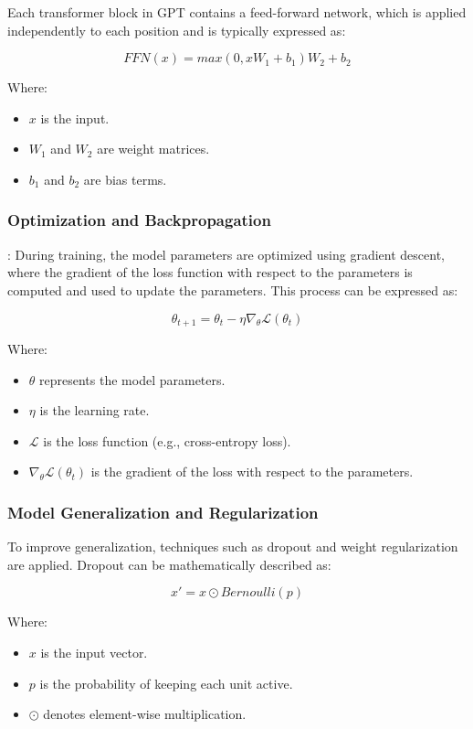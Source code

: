 \documentclass{article}
\begin{document}
Each transformer block in GPT contains a feed-forward network, which is applied independently to each position and is typically expressed as:

\[ \textit{FFN}(x) = \textit{max}(0, xW_1 + b_1)W_2 + b_2 \]

Where:
\begin{itemize}
    \item \( x \) is the input.
    \item \( W_1 \) and \( W_2 \) are weight matrices.
    \item \( b_1 \) and \( b_2 \) are bias terms.
\end{itemize}

\subsubsection{Optimization and Backpropagation}: During training, the model parameters are optimized using gradient descent, where the gradient of the loss function with respect to the parameters is computed and used to update the parameters. This process can be expressed as:

\[ \theta_{t+1} = \theta_t - \eta \nabla_{\theta} \mathcal{L}(\theta_t) \]

Where:
\begin{itemize}
    \item \( \theta \) represents the model parameters.
    \item \( \eta \) is the learning rate.
    \item \( \mathcal{L} \) is the loss function (e.g., cross-entropy loss).
    \item \( \nabla_{\theta} \mathcal{L}(\theta_t) \) is the gradient of the loss with respect to the parameters.
\end{itemize}

\subsubsection{Model Generalization and Regularization}

To improve generalization, techniques such as dropout and weight regularization are applied. Dropout can be mathematically described as:

\[ x' = x \odot \textit{Bernoulli}(p) \]

Where:
\begin{itemize}
    \item \( x \) is the input vector.
    \item \( p \) is the probability of keeping each unit active.
    \item \( \odot \) denotes element-wise multiplication.
\end{itemize}
\end{document}
